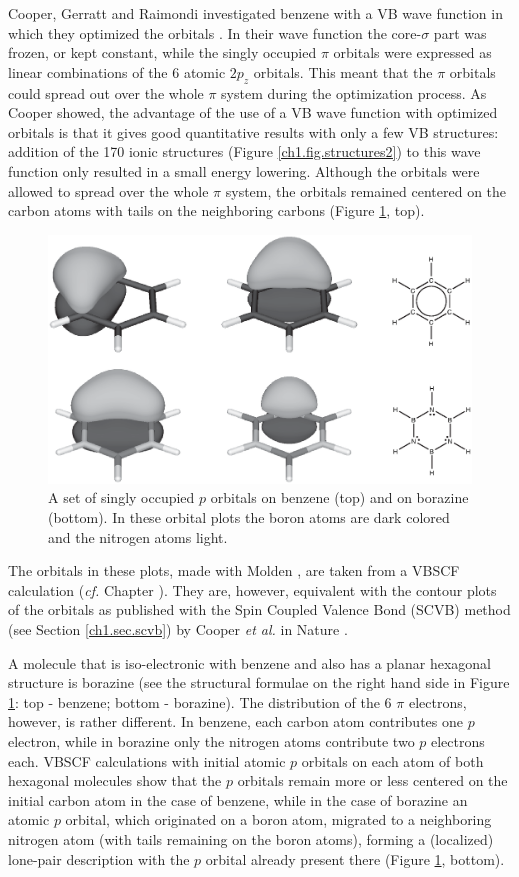 Cooper, Gerratt and Raimondi investigated benzene with a VB wave function in which they optimized the orbitals \cite{nature}. In their wave function the core-$\sigma$ part was frozen, or kept constant, while the singly occupied $\pi$ orbitals were expressed as linear combinations of the 6 atomic $2p_z$ orbitals. This meant that the $\pi$ orbitals could spread out over the whole $\pi$ system during the optimization process. As Cooper showed, the advantage of the use of a VB wave function with optimized orbitals is that it gives good quantitative results with only a few VB structures: addition of the 170 ionic structures (Figure \ref{ch1.fig.structures2}) to this wave function only resulted in a small energy lowering. Although the orbitals were allowed to spread over the whole $\pi$ system, the orbitals remained centered on the carbon atoms with tails on the neighboring carbons (Figure \ref{ch1.fig6}, top). 
\begin{figure}[htbp]
\center
\includegraphics[scale=0.5]{introduction/figures/figure6.eps}
\caption{A set of singly occupied $p$ orbitals on benzene (top) and on borazine (bottom). In these orbital plots the boron atoms are dark colored and the nitrogen atoms light.}
\label{ch1.fig6}
\end{figure}
The orbitals in these plots, made with Molden \cite{molden}, are taken from a VBSCF calculation (\textit{cf.} Chapter \chinorganic). They are, however, equivalent with the contour plots of the orbitals as published with the Spin Coupled Valence Bond (SCVB) method (see Section \ref{ch1.sec.scvb}) by Cooper \textit{et al.} in Nature \cite{nature}.

A molecule that is iso-electronic with benzene and also has a planar hexagonal structure is borazine (see the structural formulae on the right hand side in Figure \ref{ch1.fig6}: top - benzene; bottom - borazine). The distribution of the 6 $\pi$ electrons, however, is rather different. In benzene, each carbon atom contributes one $p$ electron, while in borazine only the nitrogen atoms contribute two $p$ electrons each. VBSCF calculations with initial atomic $p$ orbitals on each atom of both hexagonal molecules show that the $p$ orbitals remain more or less centered on the initial carbon atom in the case of benzene,  while in the case of borazine an atomic $p$ orbital, which originated on a boron atom, migrated to a neighboring nitrogen atom (with tails remaining on the boron atoms), forming a (localized) lone-pair description with the $p$ orbital already present there (Figure \ref{ch1.fig6}, bottom).

